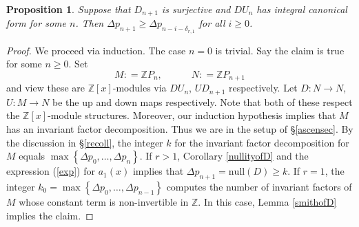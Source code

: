 \documentclass[11pt]{article}
\newtheorem{proposition}[theo]{Proposition}
\theoremstyle{definition}
\numberwithin{equation}{section}
\newcommand{\ZZ}{\mathbb{Z}}
\begin{document}
\begin{proposition} \label{conjequiv}  Suppose that $ D_{n+1} $ is surjective and  $ DU_{n}  $ has integral canonical form for some $ n $.    Then $\Delta p_{n+1}  \geq \Delta p_{n-i-\delta_{r,1} }  $
for all $ i  \geq  0  $.    
\end{proposition}  


\begin{proof} We proceed via  induction.  
The case $ n = 0 $ is trivial. Say the claim is true for some $ n \geq 0 $.    
Set $$ M :   =  \ZZ P _{n }, \quad   \quad  \quad    N  :    =  \ZZ    P_{n+1} $$ and view these are $  \ZZ  [   x] $-modules via $ DU_{n} $, $ UD_{n+1} $ respectively.  Let  $ D : N \to N $, $ U : M \to N $ be the up and down maps respectively. Note that both of these respect the $\ZZ[x]$-module structures. Moreover, our induction hypothesis implies that $ M $ has an invariant factor decomposition. Thus we are in the setup of \S \ref{ascensec}.  By the discussion in \S \ref{recoll}, the integer $ k $ for the invariant factor decomposition for $ M $ equals  $ \max \left \{ \Delta p_{0}, \ldots, \Delta p_{n}  \right \}  $.   If $ r >  1  $, Corollary \ref{nullityofD} and the expression (\ref{exp}) for $ a_{1}(x) $ implies that $ \Delta p_{n+1} = \mathrm{null}(D)  \geq k $.  If $ r = 1 $, the integer $ k_{0} = \max \left \{ \Delta p_{0}, \ldots, \Delta p_{n-1} \right \} $ computes the number of invariant factors of $ M $ whose constant term is non-invertible in $ \ZZ  $. In this case, Lemma \ref{smithofD} implies the claim. 
 \end{proof} 
 
\end{document}
